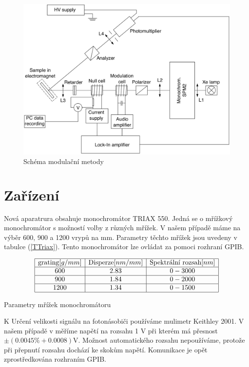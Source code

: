 \begin{figure}
    \begin{center}
    \includegraphics[width=5in]{img/MO_setup.eps}
    \end{center}
    \caption{Schéma modulační metody}
    \label{Schema modul}
\end{figure}

\section{Zařízení}
Nová aparatrura obsahuje monochromátor TRIAX 550. Jedná se o mřížkový monochromátor s možností volby z různých mřížek. V našem případě máme na výběr 600, 900 a 1200 vrypů na mm. Parametry těchto mřížek jsou uvedeny v tabulce (\ref{TTriax}). Tento monochromátor lze ovládat za pomoci rozhraní GPIB. 
\begin{table}
$$
\begin{array}{|c|c|c|}
\hline
\mbox{grating} [g/mm]&  \mbox{Disperze} [nm/mm]&    \mbox{Spektrální rozsah} [nm] \\ \hline
600&    2.83&   0 - 3000 \\ \hline
900&    1.84&   0 - 2000 \\ \hline
1200&   1.34&   0 - 1500 \\ \hline
\end{array}
$$
\caption{Parametry mřížek monochromátoru}
\label{TTriax}
\end{table}

K Určení velikosti signálu na fotonásobiči používáme mulimetr Keithley 2001. V našem případě v měříme napětí na rozsahu 1 V při kterém má přesnost $\pm(0.0045\%+0.0008)$V. Možnost automatického rozsahu nepoužíváme, protože při přepnutí rozsahu dochází ke skokům napětí. Komunikace je opět zprostředkována rozhraním GPIB.

